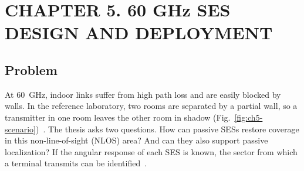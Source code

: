 \section*{CHAPTER 5. 60 GHz SES DESIGN AND DEPLOYMENT}
\setcounter{section}{5}
\setcounter{subsection}{0}
\setcounter{equation}{0}
\setcounter{theorem}{0}
\setcounter{figure}{0}
\setcounter{table}{0}

\subsection{Problem}
At 60~GHz, indoor links suffer from high path loss and are easily blocked by walls. In the reference laboratory, two rooms are separated by a partial wall, so a transmitter in one room leaves the other room in shadow (Fig.~\ref{fig:ch5-scenario})~\cite{Sabato2025}. The thesis asks two questions. How can passive SESs restore coverage in this non-line-of-sight (NLOS) area? And can they also support passive localization? If the angular response of each SES is known, the sector from which a terminal transmits can be identified~\cite{Sabato2025}.

